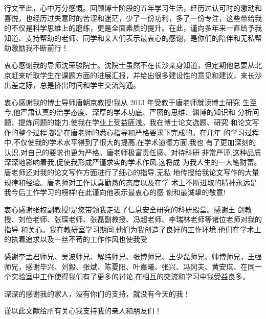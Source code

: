 

\begin{ack}
  行文至此，心中万分感慨。回顾博士阶段的五年学习生活，经历过认可时的激动和喜悦，也经历过失意时的苦涩和迷茫，少了一份功利，多了一份专注，这些带给我的不仅是科学思维上的磨练，更是全面素质的提升。在此，谨向多年来一直给予我知道、支持帮助的老师、同学和亲人们表示最衷心的感谢，是你们的陪伴和无私帮助激励我不断前行！
  
  衷心感谢我的导师沈荣骏院士。沈院士虽然不在长沙亲身知道，但定期他总要从北京赶来听取学生在课题方面的进展汇报，并给出很多建设性的意见和建议，来长沙出差之际，总是挤出时间和学生交流沟通。
  
  衷心感谢我的博士导师唐朝京教授!我从 2013 年受教于唐老师就读博士研究
  生至今,他严肃认真的治学态度、深厚的学术功底、严密的思维、渊博的知识和
  分析问题、提炼问题的能力,使我在学业上受益匪浅。我在博士论文选题、研究
  和论文写作的整个过程,都是在唐老师的悉心指导和严格要求下完成的。在几年
  的学习过程中,不仅使我的学术水平得到了很大的提高,在学术道德方面,我也
  有了更加深刻的认识,对自己的要求也更为严格。唐老师极富责任感、对待科研
  非常严谨,这种品质深深地影响着我,促使我形成严谨求实的学术作风,这将成
  为我人生的一大笔财富。唐老师还对我的论文写作方面进行了细心的指导,无私
  地传授给我论文写作的大量规律和经验。唐老师对工作认真勤恳的态度以及在学
  术上不断进取的精神永远是我今后工作学习的榜样!在此谨向他表示最衷心的感
  谢和最诚挚的敬意!
  
  衷心感谢张权副教授!是您带领我走进了信息安全研究的科研殿堂。感谢王
  剑教授、刘俭老师、张琛老师、张磊副教授、冯超老师、李瑞林老师等诸位老师对我的指导
  和关心。我在教研室学习期间,他们为我创造了良好的工作环境,他们在学术上
  的执着追求以及一丝不苟的工作作风也使我受
  
  感谢李孟君师兄、吴波师兄、解纬师兄、张博师兄、王少磊师兄、帅博师兄，王强师兄，感谢毕兴、刘毅、张斌、陈夏阳、叶嘉曦、张兴、冯冈夫、黄安琪、在同一个实验室中工作使得我们有了更多的讨论,在相互的交流和学习中我受益良多。
  
  深深的感谢我的家人，没有你们的支持，就没有今天的我！
  
  谨以此文献给所有关心我支持我的亲人和朋友们！

\end{ack}
